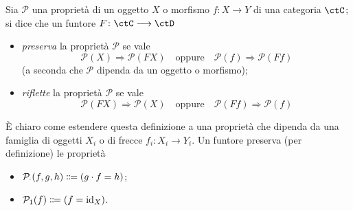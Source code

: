 \begin{definition}\label{def_preserva_riflette}
 Sia \(\mathcal{P}\) una proprietà di un oggetto \(X\) o morfismo \(f \colon X\to Y\) di una categoria \(\ctC\); si dice che un funtore \(F \colon \ctC \fun\ctD\)
 \begin{itemize}
  \item \emph{preserva} la proprietà \(\mathcal{P}\) se vale
        \[\mathcal{P}(X) \Rightarrow \mathcal{P}(FX) \quad \text{oppure} \quad
         \mathcal{P}(f) \Rightarrow \mathcal{P}(Ff) \]
        (a seconda che \(\mathcal P\) dipenda da un oggetto o morfismo);
  \item \emph{riflette} la proprietà \(\mathcal{P}\) se vale
        \[\mathcal{P}(FX) \Rightarrow \mathcal{P}(X) \quad \text{oppure} \quad
         \mathcal{P}(Ff) \Rightarrow \mathcal{P}(f) \]
 \end{itemize}
 È chiaro come estendere questa definizione a una proprietà che dipenda da una famiglia di oggetti \(X_i\) o di frecce \(f_i \colon X_i\to Y_i\). Un funtore preserva (per definizione) le proprietà
 \begin{itemize}
  \item \(\mathcal P_\cmp(f,g,h) \defeq  (g\cmp f = h)\);
  \item \(\mathcal P_1(f) \defeq  (f = \id_X)\).
 \end{itemize}
\end{definition}
